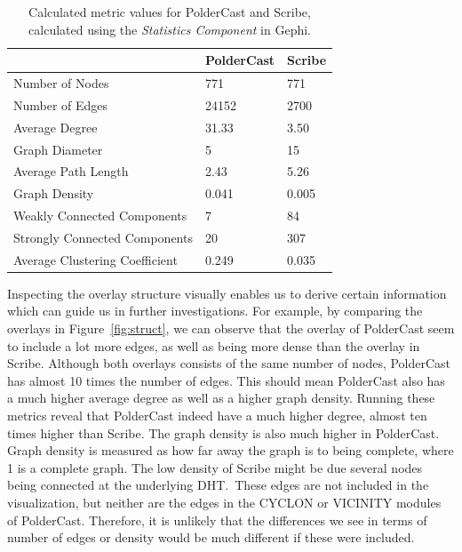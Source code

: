 \begin{table}[h!]
    \centering
    \begin{tabular}{|l | l | l |}
        \hline
        & PolderCast & Scribe \\ \hline
        \hline
        Number of Nodes & 771 & 771 \\ \hline
        Number of Edges & 24152 & 2700 \\ \hline
        Average Degree & 31.33 & 3.50 \\ \hline
        Graph Diameter & 5 & 15 \\ \hline
        Average Path Length & 2.43 & 5.26 \\ \hline
        Graph Density & 0.041 & 0.005 \\ \hline
        Weakly Connected Components & 7 & 84 \\ \hline
        Strongly Connected Components & 20 & 307 \\ \hline
        Average Clustering Coefficient & 0.249 & 0.035 \\ \hline

    \end{tabular}
    \caption{Calculated metric values for PolderCast and Scribe, calculated using
        the \emph{Statistics Component} in Gephi.}
    \label{tab:struct_metrics}
\end{table}

Inspecting the overlay structure visually enables us to derive certain
information which can guide us in further investigations. For example,
by comparing the overlays in Figure~\ref{fig:struct}, we can observe
that the overlay of PolderCast seem to include a lot more edges, as well
as being more dense than the overlay in Scribe. Although both overlays
consists of the same number of nodes, PolderCast has almost 10 times the
number of edges. This should mean PolderCast also has a much higher
average degree as well as a higher graph density.  Running these metrics
reveal that PolderCast indeed have a much higher degree, almost ten
times higher than Scribe. The graph density is also much higher in
PolderCast. Graph density is measured as how far away the graph is to
being complete, where 1 is a complete graph. The low density of Scribe
might be due several nodes being connected at the underlying DHT.\ These
edges are not included in the visualization, but neither are the edges
in the CYCLON or VICINITY modules of PolderCast. Therefore, it is
unlikely that the differences we see in terms of number of edges or
density would be much different if these were included.

